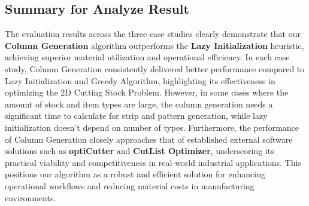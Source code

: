 \documentclass[a4paper]{article}
\begin{document}
 \begin{table}[H]
        \centering
        \caption{Evaluation Using Our Code}
\end{table}
\FloatBarrier
\subsection*{Summary for Analyze Result}

The evaluation results across the three case studies clearly demonstrate that our \textbf{Column Generation} algorithm outperforms the \textbf{Lazy Initialization} heuristic, achieving superior material utilization and operational efficiency. In each case study, Column Generation consistently delivered better performance compared to Lazy Initialization and Greedy Algorithm, highlighting its effectiveness in optimizing the 2D Cutting Stock Problem. However, in some cases where the amount of stock and item types are large, the column generation needs a significant time to calculate for strip and pattern generation, while lazy initialization doesn't depend on number of types. Furthermore, the performance of Column Generation closely approaches that of established external software solutions such as \textbf{optiCutter} and \textbf{CutList Optimizer}, underscoring its practical viability and competitiveness in real-world industrial applications. This positions our algorithm as a robust and efficient solution for enhancing operational workflows and reducing material costs in manufacturing environments.

\vspace{0.4cm}
\end{document}
